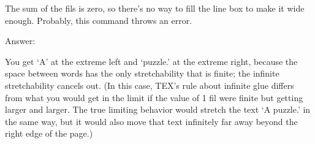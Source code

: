 
The sum of the fils is zero, so there's no way to fill the line box to make it wide enough.
Probably, this command throws an error.


Answer:

You get `A' at the extreme left and `puzzle.' at the extreme right, because the
space between words has the only stretchability that is finite; the infinite stretchability
cancels out. (In this case, TEX’s rule about infinite glue differs from what you would
get in the limit if the value of 1 fil were finite but getting larger and larger. The true
limiting behavior would stretch the text `A puzzle.' in the same way, but it would also
move that text infinitely far away beyond the right edge of the page.)

\bye


